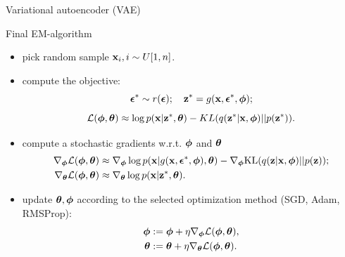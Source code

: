 \begin{frame}{Variational autoencoder (VAE)}
	\begin{block}{Final EM-algorithm}
		\begin{itemize}
			\item pick random sample $\mathbf{x}_i, i \sim U[1, n]$.
			\item compute the objective:
			\vspace{-0.3cm}
			\[
				\boldsymbol{\epsilon}^* \sim r(\boldsymbol{\epsilon}); \quad \mathbf{z}^* = g(\mathbf{x}, \boldsymbol{\epsilon}^*, \boldsymbol{\phi});
			\]
			\[
				\mathcal{L}(\boldsymbol{\phi}, \boldsymbol{\theta}) \approx  \log p(\mathbf{x} | \mathbf{z}^*, \boldsymbol{\theta}) - KL(q(\mathbf{z}^* | \mathbf{x}, \boldsymbol{\phi}) || p(\mathbf{z}^*)).
			\]
			\item compute a stochastic gradients w.r.t. $\boldsymbol{\phi}$ and $\boldsymbol{\theta}$
			\begin{align*}
				\nabla_{\boldsymbol{\phi}} \mathcal{L} (\boldsymbol{\phi}, \boldsymbol{\theta}) &\approx \nabla_{\boldsymbol{\phi}} \log p(\mathbf{x} | g(\mathbf{x}, \boldsymbol{\epsilon}^*, \boldsymbol{\phi}), \boldsymbol{\theta})  - \nabla_{\boldsymbol{\phi}} \text{KL}(q(\mathbf{z} | \mathbf{x}, \boldsymbol{\phi}) || p(\mathbf{z})); \\
				\nabla_{\boldsymbol{\theta}} \mathcal{L} (\boldsymbol{\phi}, \boldsymbol{\theta}) &\approx \nabla_{\boldsymbol{\theta}} \log p(\mathbf{x}|\mathbf{z}^*, \boldsymbol{\theta}).
			\end{align*}
			\item update $\boldsymbol{\theta}, \boldsymbol{\phi}$ according to the selected optimization method (SGD, Adam, RMSProp):
			\begin{align*}
				\boldsymbol{\phi} &:= \boldsymbol{\phi} + \eta \nabla_{\boldsymbol{\phi}} \mathcal{L}(\boldsymbol{\phi}, \boldsymbol{\theta}), \\
				\boldsymbol{\theta} &:= \boldsymbol{\theta} + \eta \nabla_{\boldsymbol{\theta}} \mathcal{L}(\boldsymbol{\phi}, \boldsymbol{\theta}).
			\end{align*}
		\end{itemize}
	\end{block}
\end{frame}
